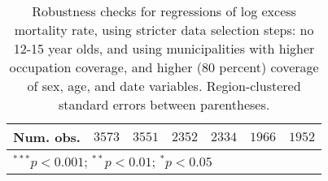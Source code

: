 \begin{table}[h!]
\begin{center}
\begin{small}
\begin{tabular}{l c c c c c c}
Num. obs.      & $3573$        & $3551$        & $2352$        & $2334$        & $1966$        & $1952$        \\
\hline
\multicolumn{7}{l}{\tiny{$^{***}p<0.001$; $^{**}p<0.01$; $^{*}p<0.05$}}
\end{tabular}
\end{small}
\caption{Robustness checks for regressions of log excess mortality rate, using stricter data selection steps: no 12-15 year olds, and using municipalities with higher occupation coverage, and higher (80 percent) coverage of sex, age, and date variables. Region-clustered standard errors between parentheses.}
\label{tab:cutoffmodels}
\end{center}
\end{table}
